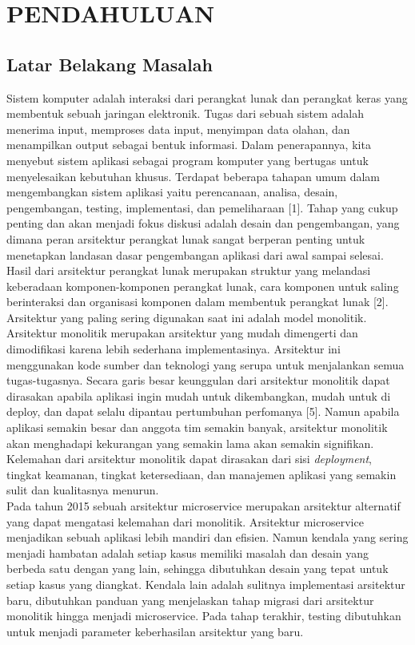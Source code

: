 \chapter{PENDAHULUAN}

\vspace{4.5pt}

\section{Latar Belakang Masalah} \label{sec:latar_belakang}
Sistem komputer adalah interaksi dari perangkat lunak dan perangkat keras yang membentuk sebuah jaringan elektronik. Tugas dari sebuah sistem adalah menerima input, memproses data input, menyimpan data olahan, dan menampilkan output sebagai bentuk informasi. Dalam penerapannya, kita menyebut sistem aplikasi sebagai program komputer yang bertugas untuk menyelesaikan kebutuhan khusus. Terdapat beberapa tahapan umum dalam mengembangkan sistem aplikasi yaitu perencanaan, analisa, desain, pengembangan, testing, implementasi, dan pemeliharaan [1].  Tahap yang cukup penting dan akan menjadi fokus diskusi adalah desain dan pengembangan, yang dimana peran arsitektur perangkat lunak sangat berperan penting untuk menetapkan landasan dasar pengembangan aplikasi dari awal sampai selesai. Hasil dari arsitektur perangkat lunak merupakan struktur yang melandasi keberadaan komponen-komponen perangkat lunak, cara komponen untuk saling berinteraksi dan organisasi komponen dalam membentuk perangkat lunak [2]. Arsitektur yang paling sering digunakan saat ini adalah model monolitik. Arsitektur monolitik merupakan arsitektur yang mudah dimengerti dan dimodifikasi karena lebih sederhana implementasinya. Arsitektur ini menggunakan kode sumber dan teknologi yang serupa untuk menjalankan semua tugas-tugasnya. Secara garis besar keunggulan dari arsitektur monolitik dapat dirasakan apabila aplikasi ingin mudah untuk dikembangkan, mudah untuk di deploy, dan dapat selalu dipantau pertumbuhan perfomanya [5]. Namun apabila aplikasi semakin besar dan anggota tim semakin banyak, arsitektur monolitik akan menghadapi kekurangan yang semakin lama akan semakin signifikan. Kelemahan dari arsitektur monolitik dapat dirasakan dari sisi \textit{deployment}, tingkat keamanan, tingkat ketersediaan, dan manajemen aplikasi yang semakin sulit dan kualitasnya menurun.\\
Pada tahun 2015 sebuah arsitektur microservice merupakan arsitektur alternatif yang dapat mengatasi kelemahan dari monolitik. Arsitektur microservice menjadikan sebuah aplikasi lebih mandiri dan efisien. Namun kendala yang sering menjadi hambatan adalah setiap kasus memiliki masalah dan desain yang berbeda satu dengan yang lain, sehingga dibutuhkan desain yang tepat untuk setiap kasus yang diangkat. Kendala lain adalah sulitnya implementasi arsitektur baru, dibutuhkan panduan yang menjelaskan tahap migrasi dari arsitektur monolitik hingga menjadi microservice. Pada tahap terakhir, testing dibutuhkan untuk menjadi parameter keberhasilan arsitektur yang baru.\\
